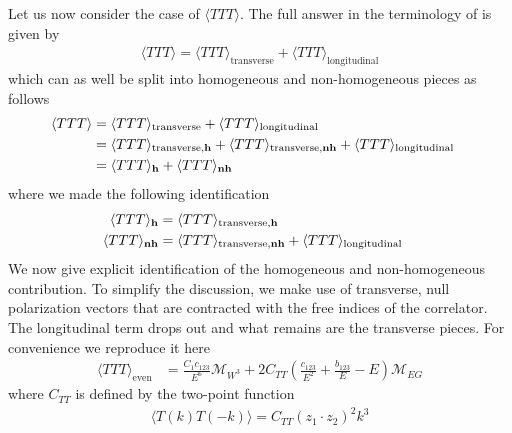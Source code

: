 \documentclass[a4paper,11pt]{article}
\begin{document}
Let us now consider the case of $\langle TTT\rangle$. The full answer in the terminology of \cite{Bzowski:2013sza} is given by
 \begin{align}
 \langle TTT\rangle = \langle TTT\rangle _{\text{transverse}}+ \langle TTT\rangle _{\text{longitudinal}}
 \end{align}
 which can as well be split into homogeneous and non-homogeneous pieces as follows
 \begin{align}
 \langle TTT\rangle &= \langle TTT\rangle _{\text{transverse}}+ \langle TTT\rangle _{\text{longitudinal}}\cr
 &=\langle TTT\rangle _{\text{transverse},\bf{h}}+\langle TTT\rangle _{\text{transverse},\bf{nh}}+\langle TTT\rangle _{\text{longitudinal}}\cr
 &=\langle TTT\rangle _{\bf{h}}+\langle TTT\rangle _{\bf{nh}}
 \end{align}
 where we made the following identification
 \begin{align}
 \langle TTT\rangle _{\bf{h}}&=\langle TTT\rangle _{\text{transverse},\bf{h}}\cr
 \langle TTT\rangle _{\bf{nh}}&=\langle TTT\rangle _{\text{transverse},\bf{nh}}+\langle TTT\rangle _{\text{longitudinal}}
 \end{align}
 We now give explicit identification of the homogeneous and non-homogeneous contribution.  To simplify the discussion, we make use of  transverse, null polarization vectors that are contracted with the free indices of the correlator. The longitudinal term drops out and what remains are the transverse pieces. For convenience we reproduce it here \cite{Farrow:2018yni,Jain:2021qcl}
  \begin{align}\label{ttttransapp}
\langle TTT\rangle_{\text{even}}&=\frac{C_1c_{123}}{E^6}\mathcal M_{W^3}
+2C_{TT}\left(\frac{c_{123}}{E^2}+\frac{b_{123}}{E}-E\right)\mathcal M_{EG}
\end{align}
 where $C_{TT}$ is defined by the two-point function
 \begin{align}
\langle T(k)T(-k)\rangle=C_{TT}(z_1\cdot z_2)^{2}k^3
 \end{align}
\end{document}
